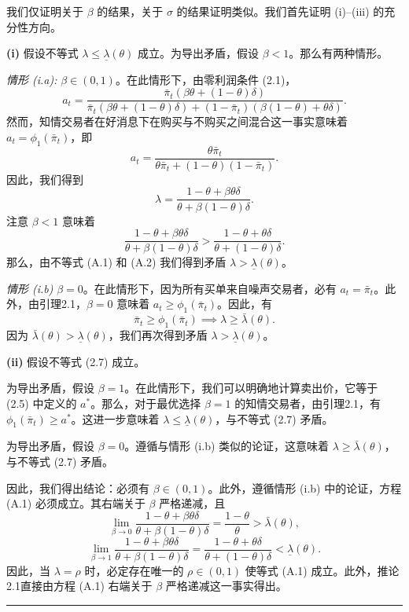 \documentclass[12pt,a4paper]{article}
\newenvironment{translation}{%
  \par\vspace{2pt}\noindent%
  \color{transblue}%
  \ignorespaces
}{%
  \par\vspace{4pt}\hrule\vspace{6pt}%
}
\begin{document}
\begin{translation}
我们仅证明关于 $\beta$ 的结果，关于 $\sigma$ 的结果证明类似。我们首先证明 (i)--(iii) 的充分性方向。

\textbf{(i)} 假设不等式 $\lambda \leq \underline{\lambda}(\theta)$ 成立。为导出矛盾，假设 $\beta < 1$。那么有两种情形。

\textit{情形 (i.a):} $\beta \in (0, 1)$。在此情形下，由零利润条件 (2.1)，
\[
a_t = \frac{\bar{\pi}_t(\beta\theta + (1-\theta)\delta)}{\bar{\pi}_t(\beta\theta + (1-\theta)\delta) + (1-\bar{\pi}_t)(\beta(1-\theta) + \theta\delta)}.
\]
然而，知情交易者在好消息下在购买与不购买之间混合这一事实意味着 $a_t = \phi_1(\bar{\pi}_t)$，即
\[
a_t = \frac{\theta\bar{\pi}_t}{\theta\bar{\pi}_t + (1-\theta)(1-\bar{\pi}_t)}.
\]
因此，我们得到
\[
\lambda = \frac{1 - \theta + \beta\theta\delta}{\theta + \beta(1-\theta)\delta}. \tag{A.1}
\]
注意 $\beta < 1$ 意味着
\[
\frac{1 - \theta + \beta\theta\delta}{\theta + \beta(1-\theta)\delta} > \frac{1 - \theta + \theta\delta}{\theta + (1-\theta)\delta}. \tag{A.2}
\]
那么，由不等式 (A.1) 和 (A.2) 我们得到矛盾 $\lambda > \underline{\lambda}(\theta)$。

\textit{情形 (i.b)} $\beta = 0$。在此情形下，因为所有买单来自噪声交易者，必有 $a_t = \bar{\pi}_t$。此外，由引理2.1，$\beta = 0$ 意味着 $a_t \geq \phi_1(\bar{\pi}_t)$。因此，有
\[
\bar{\pi}_t \geq \phi_1(\bar{\pi}_t) \implies \lambda \geq \bar{\lambda}(\theta).
\]
因为 $\bar{\lambda}(\theta) > \underline{\lambda}(\theta)$，我们再次得到矛盾 $\lambda > \underline{\lambda}(\theta)$。

\textbf{(ii)} 假设不等式 (2.7) 成立。

为导出矛盾，假设 $\beta = 1$。在此情形下，我们可以明确地计算卖出价，它等于 (2.5) 中定义的 $a^*$。那么，对于最优选择 $\beta = 1$ 的知情交易者，由引理2.1，有 $\phi_1(\bar{\pi}_t) \geq a^*$。这进一步意味着 $\lambda \leq \underline{\lambda}(\theta)$，与不等式 (2.7) 矛盾。

为导出矛盾，假设 $\beta = 0$。遵循与情形 (i.b) 类似的论证，这意味着 $\lambda \geq \bar{\lambda}(\theta)$，与不等式 (2.7) 矛盾。

因此，我们得出结论：必须有 $\beta \in (0, 1)$。此外，遵循情形 (i.b) 中的论证，方程 (A.1) 必须成立。其右端关于 $\beta$ 严格递减，且
\[
\lim_{\beta \to 0} \frac{1 - \theta + \beta\theta\delta}{\theta + \beta(1-\theta)\delta} = \frac{1-\theta}{\theta} > \bar{\lambda}(\theta),
\]
\[
\lim_{\beta \to 1} \frac{1 - \theta + \beta\theta\delta}{\theta + \beta(1-\theta)\delta} = \frac{1 - \theta + \theta\delta}{\theta + (1-\theta)\delta} < \underline{\lambda}(\theta).
\]
因此，当 $\lambda = \rho$ 时，必定存在唯一的 $\rho \in (0, 1)$ 使等式 (A.1) 成立。此外，推论2.1直接由方程 (A.1) 右端关于 $\beta$ 严格递减这一事实得出。


\end{translation}
\end{document}
